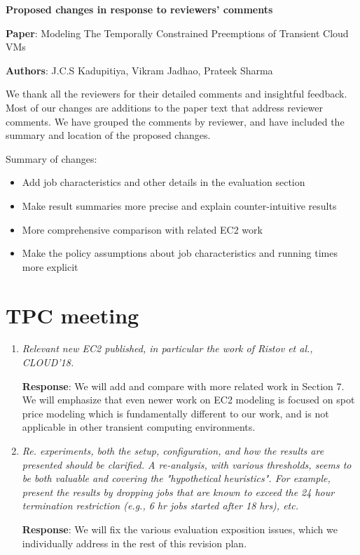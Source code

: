 \documentclass{article}
\newcommand{\resp}[1]{\textbf{Response}: #1}
\newcommand{\revmade}[1]{\textbf{Revision Made}: #1}
\begin{document}
\begin{center}
  \large{\textbf {Proposed changes in response to reviewers'
      comments}}

{\textbf{Paper}:  Modeling The Temporally Constrained Preemptions of Transient Cloud VMs}

{\textbf{Authors}: J.C.S Kadupitiya, Vikram Jadhao, Prateek Sharma}
\end{center}

\date{April 1 2020}

We thank all the reviewers for their detailed comments and insightful feedback.
Most of our changes are additions to the paper text that address reviewer comments. 
We have grouped the comments by reviewer, and have included the summary and location of the proposed changes.

Summary of changes:
\begin{itemize}
\item Add job characteristics and other details in the evaluation section
\item Make result summaries more precise and explain counter-intuitive results
\item More comprehensive comparison with related EC2 work 
\item Make the policy assumptions about job characteristics and running times more explicit 
\end{itemize}

\section{TPC meeting}

\begin{enumerate}

\item \emph{Relevant new EC2 published, in particular the work of Ristov et al., CLOUD'18.}

\resp{We will add and compare with more related work in Section 7. We will emphasize that even newer work on EC2 modeling is focused on spot price modeling which is fundamentally different to our work, and is not applicable in other transient computing environments.}


\item \emph{Re. experiments, both the setup, configuration, and how the results are presented should be clarified. A re-analysis, with various thresholds, seems to be both valuable and covering the "hypothetical heuristics". For example, present the results by dropping jobs that are known to exceed the 24 hour termination restriction (e.g., 6 hr jobs started after 18 hrs), etc.}

\resp{We will fix the various evaluation exposition issues, which we individually address in the rest of this revision plan.}



\end{enumerate}
\end{document}
